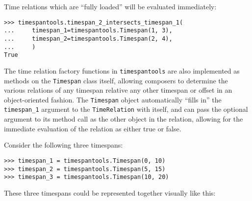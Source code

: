 \noindent Time relations which are \enquote{fully loaded} will be evaluated
immediately:

\begin{comment}
<abjad>
timespantools.timespan_2_intersects_timespan_1(
    timespan_1=timespantools.Timespan(1, 3),
    timespan_2=timespantools.Timespan(2, 4),
    )
</abjad>
\end{comment}

\begin{singlespacing}
\vspace{-0.5\baselineskip}
\begin{lstlisting}
>>> timespantools.timespan_2_intersects_timespan_1(
...     timespan_1=timespantools.Timespan(1, 3),
...     timespan_2=timespantools.Timespan(2, 4),
...     )
True
\end{lstlisting}
\end{singlespacing}

\noindent The time relation factory functions in \texttt{timespantools} are
also implemented as methods on the \texttt{Timespan} class itself, allowing
composers to determine the various relations of any timespan relative any other
timespan or offset in an object-oriented fashion. The \texttt{Timespan} object
automatically \enquote{fills in} the \texttt{timespan\_1} argument to the
\texttt{TimeRelation} with itself, and can pass the optional argument to its
method call as the other object in the relation, allowing for the immediate
evaluation of the relation as either true or false.

Consider the following three timespans:

\begin{comment}
<abjad>
timespan_1 = timespantools.Timespan(0, 10)
timespan_2 = timespantools.Timespan(5, 15)
timespan_3 = timespantools.Timespan(10, 20)
</abjad>
\end{comment}

\begin{singlespacing}
\vspace{-0.5\baselineskip}
\begin{lstlisting}
>>> timespan_1 = timespantools.Timespan(0, 10)
>>> timespan_2 = timespantools.Timespan(5, 15)
>>> timespan_3 = timespantools.Timespan(10, 20)
\end{lstlisting}
\end{singlespacing}

\noindent These three timespans could be represented together visually like
this:

